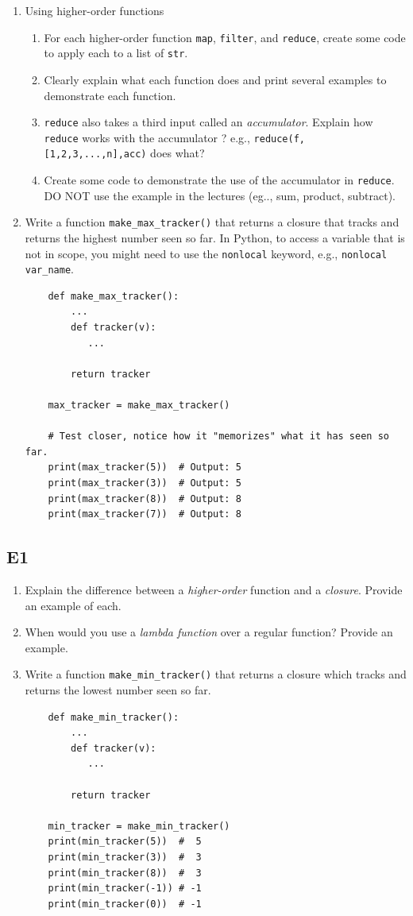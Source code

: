 \documentclass[oneside,11pt,dvipsnames]{book}
\newcommand{\code}[1]{\texttt{#1}}
\begin{document}
\begin{enumerate}
\item Using higher-order functions
\begin{enumerate}
\item For each higher-order function \code{map}, \code{filter}, and \code{reduce}, create some code to apply each to a list of \code{str}.
\item Clearly explain what each function does and print several examples to demonstrate each function.
\item \code{reduce} also takes a third input called an \emph{accumulator}.  Explain how \code{reduce} works with the accumulator ? e.g., \code{reduce(f,[1,2,3,...,n],acc)} does what?
\item Create some code to demonstrate the use of the accumulator in \code{reduce}. DO NOT use the example in the lectures (eg.., sum, product, subtract).
\end{enumerate}

\item Write a function \code{make\_max\_tracker()} that returns a closure that tracks and returns the highest number seen so far. In Python, to access a variable that is not in scope, you might need to use the \code{nonlocal} keyword, e.g., \code{nonlocal var\_name}.
\begin{lstlisting}
    def make_max_tracker():
        ...
        def tracker(v):
           ...
        
        return tracker

    max_tracker = make_max_tracker()

    # Test closer, notice how it "memorizes" what it has seen so far.
    print(max_tracker(5))  # Output: 5
    print(max_tracker(3))  # Output: 5
    print(max_tracker(8))  # Output: 8
    print(max_tracker(7))  # Output: 8
\end{lstlisting} 

\end{enumerate}

\subsection{E1}\label{exercise:e1}
\begin{enumerate}
    \item Explain the difference between a \emph{higher-order} function and a \emph{closure}. Provide an example of each.
    \item When would you use a \emph{lambda function} over a regular function? Provide an example.
    \item Write a function \code{make\_min\_tracker()} that returns a closure which tracks and returns the lowest number seen so far.
    \begin{lstlisting}
    def make_min_tracker():
        ...
        def tracker(v):
           ...
        
        return tracker

    min_tracker = make_min_tracker()
    print(min_tracker(5))  #  5
    print(min_tracker(3))  #  3
    print(min_tracker(8))  #  3
    print(min_tracker(-1)) # -1
    print(min_tracker(0))  # -1
    \end{lstlisting}
\end{enumerate}
\end{document}
